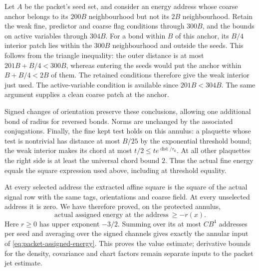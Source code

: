 Let $A$ be the packet's seed set, and consider an energy address
whose coarse anchor belongs to its $200B$ neighbourhood but not
its $2B$ neighbourhood. Retain the weak fine, predictor and coarse
flag conditions through $300B$, and the bounds on active variables
through $304B$. For a bond within $B$ of this anchor, its
$B/4$ interior patch lies within the $300B$ neighbourhood and
outside the seeds. This follows from the triangle inequality:
the outer distance is at most $201B+B/4<300B$, whereas entering
the seeds would put the anchor within $B+B/4<2B$ of them.
The retained conditions therefore give the weak interior just used.
The active-variable condition is available since $201B<304B$.
The same argument supplies a clean coarse patch at the anchor.

Signed changes of orientation preserve these conclusions, allowing
one additional bond of radius for reversed bonds. Norms are
unchanged by the associated conjugations. Finally, the fine kept
test holds on this annulus: a plaquette whose test is nontrivial
has distance at most $B/25$ by the exponential threshold bound;
the weak interior makes its chord at most $t/2\le
t e^{\operatorname{dist}/r_0}$. At all other plaquettes the
right side is at least the universal chord bound $2$.
Thus the actual fine energy equals the square expression used above,
including at threshold equality.

At every selected address the extracted affine square is the square
of the actual signal row with the same tags, orientations and coarse
field. At every unselected address it is zero. We have therefore
proved, on the protected annulus,
\begin{equation}\label{eq:annulus-final}
 \text{actual assigned energy at the address}\ \ge-r(x).
\end{equation}
Here $r\ge0$ has upper exponent $-3/2$.
Summing over its at most $C B^4$ addresses per seed and averaging
over the signed channels gives exactly the annular input of
\eqref{eq:packet-assigned-energy}. This proves the value estimate;
derivative bounds for the density, covariance and chart factors
remain separate inputs to the packet jet estimate.
